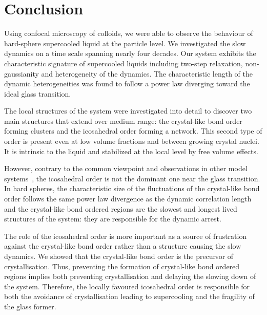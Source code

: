 \chapter{Conclusion}

Using confocal microscopy of colloids, we were able to observe the behaviour of hard-sphere supercooled liquid at the particle level. We investigated the slow dynamics on a time scale spanning nearly four decades. Our system exhibits the characteristic signature of supercooled liquids including two-step relaxation, non-gaussianity and heterogeneity of the dynamics. The characteristic length of the dynamic heterogeneities was found to follow a power law diverging toward the ideal glass transition.

The local structures of the system were investigated into detail to discover two main structures that extend over medium range: the crystal-like bond order forming clusters and the icosahedral order forming a network. This second type of order is present even at low volume fractions and between growing crystal nuclei. It is intrinsic to the liquid and stabilized at the local level by free volume effects.

However, contrary to the common viewpoint\citep{tarjus2005fba} and observations in other model systems~\citep{Dzugutov2002}, the icosahedral order is not the dominant one near the glass transition. In hard spheres, the characteristic size of the fluctuations of the crystal-like bond order follows the same power law divergence as the dynamic correlation length and the crystal-like bond ordered regions are the slowest and longest lived structures of the system: they are responsible for the dynamic arrest.

The role of the icosahedral order is more important as a source of frustration against the crystal-like bond order rather than a structure causing the slow dynamics. We showed that the crystal-like bond order is the precursor of crystallisation. Thus, preventing the formation of crystal-like bond ordered regions implies both preventing crystallisation and delaying the slowing down of the system. Therefore, the locally favoured icosahedral order is responsible for both the avoidance of crystallisation leading to supercooling and the fragility of the glass former.